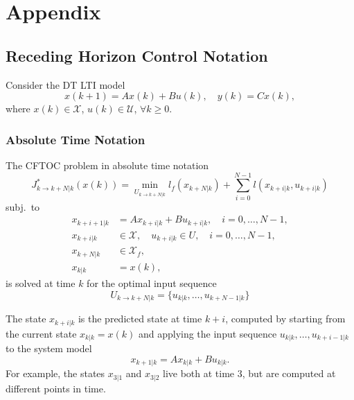 \section{Appendix}
\subsection{Receding Horizon Control Notation}
Consider the DT LTI model
\begin{equation*}
    x(k + 1) = A x(k) + B u(k), \quad y(k) = C x(k),
\end{equation*}
where $x(k) \in \mathcal{X}$, $u(k) \in \mathcal{U}$, $\forall k \geq 0$.

\subsubsection{Absolute Time Notation}

The CFTOC problem in absolute time notation
\begin{equation*}
    J^*_{{k \to k+N | k}}(x(k)) = \min_{U_{k \to k+N | k}} l_f (x_{k+N | k}) + \sum_{i=0}^{N-1} l(x_{k+i | k}, u_{k+i | k})
\end{equation*}
subj.\ to   %
\begin{align*}
    x_{k+i+1 | k} & = A x_{k+i | k} + B u_{k+i | k}, \quad i = 0, \dots, N - 1,          \\
    x_{k+i | k}   & \in \mathcal{X}, \quad u_{k+i | k} \in U, \quad i = 0, \dots, N - 1, \\
    x_{k+N | k}   & \in \mathcal{X}_f,                                                   \\
    x_{k | k}     & = x(k),
\end{align*}
is solved at time $k$ for the optimal input sequence
\begin{equation*}
    U_{k \to k+N | k} = \{u_{k | k}, \dots, u_{k+N-1 | k}\}
\end{equation*}

\newpar{}

The state $x_{k+i | k}$ is the predicted state at time $k + i$, computed by starting from the current state $x_{k | k} = x(k)$ and applying the input sequence $u_{k | k}, \dots, u_{k+i-1 | k}$ to the system model
\begin{equation*}
    x_{k+1 | k} = A x_{k | k} + B u_{k | k}.
\end{equation*}
For example, the states $x_{3| 1}$ and $x_{3| 2}$ live both at time $3$, but are computed at different points in time.

